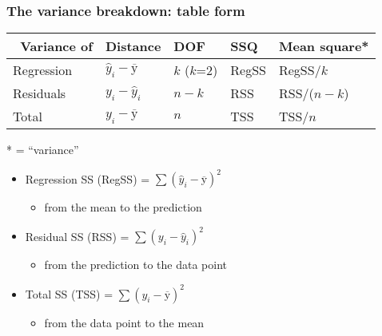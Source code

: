 \begin{frame}\frametitle{The variance breakdown: table form}

	\newpage
	\begin{table}
		[ht] \centering
		\begin{tabular}
			{lllll} \hline\ \textbf{Variance of} 	& \textbf{Distance} 					&\textbf{DOF} 	&\textbf{SSQ} 	&\textbf{Mean square}* \\
			\hline Regression 						& $\hat{y}_i - \overline{\mathrm{y}}$ 	& $k$ ($k$=2) 	& RegSS 		& RegSS/$k$ \\
			Residuals 								& $y_i - \hat{y}_i$ 					& $n-k$ 		& RSS 			& RSS/($n-k$) \\\hline \hline 
			Total 									& $y_i - \overline{\mathrm{y}}$ 		& $n$ 			& TSS 			& TSS/$n$ \\
			\hline
		\end{tabular}
	\end{table}
	* {\color{purple}{mean square}} = ``variance''
	\vspace{18pt}
	\begin{itemize}
		\item	Regression SS (RegSS) = $\sum{(\hat{y}_i - \overline{\mathrm{y}})^2}$ 
			\begin{itemize}
				\item	from the mean to the prediction
			\end{itemize}
			
		\vspace{12pt}
		\item	Residual SS (RSS) = $\sum{(y_i - \hat{y}_i)^2}$
		\begin{itemize}
			\item	from the prediction to the data point
		\end{itemize} 
		
		\vspace{12pt}
		\item	Total SS (TSS) = $\sum{(y_i - \overline{\mathrm{y}})^2}$ 
		\begin{itemize}
			\item	from the data point to the mean
		\end{itemize}
	\end{itemize}
\end{frame}

